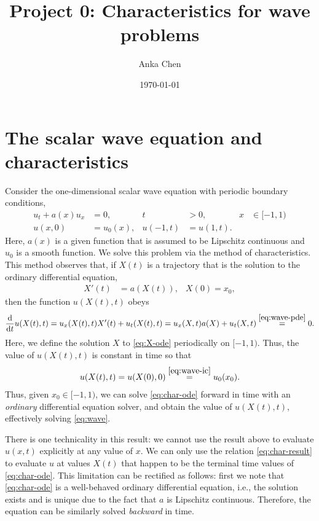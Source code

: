 \documentclass[11pt]{amsart}
\title{Project 0: Characteristics for wave problems}
\author{Anka Chen}
\date{\today}
\begin{document}
\maketitle

\section{The scalar wave equation and characteristics}
Consider the one-dimensional scalar wave equation with periodic boundary conditions,
\begin{subequations}\label{eq:wave}
  \begin{align}\label{eq:wave-pde}
    u_t + a(x) u_x &= 0, & t &> 0, & x &\in [-1,1) \\\label{eq:wave-ic}
  u(x,0) &= u_0(x), & u(-1,t) &= u(1,t).
\end{align}
\end{subequations}
Here, $a(x)$ is a given function that is assumed to be Lipschitz continuous and $u_0$ is a smooth function. We solve this problem via the method of characteristics. This method observes that, if $X(t)$ is a trajectory that is the solution to the ordinary differential equation,
\begin{align}\label{eq:X-ode}
  X'(t) &= a(X(t)), & X(0) = x_0,
\end{align}
then the function $u(X(t), t)$ obeys
\begin{align}\label{eq:char-ode}
  \frac{\mathrm{d}}{\mathrm{d} t} u(X(t),t) = u_x(X(t),t) X'(t) + u_t(X(t),t) = u_x(X,t) a(X) + u_t(X,t) \stackrel{\eqref{eq:wave-pde}}{=} 0.
\end{align}
Here, we define the solution $X$ to \eqref{eq:X-ode} periodically on $[-1,1)$. Thus, the value of $u(X(t),t)$ is constant in time so that
\begin{align}\label{eq:char-result}
  u(X(t),t) = u(X(0),0) \stackrel{\eqref{eq:wave-ic}}{=} u_0(x_0).
\end{align}
Thus, given $x_0 \in [-1,1)$, we can solve \eqref{eq:char-ode} forward in time with an \textit{ordinary} differential equation solver, and obtain the value of $u(X(t),t)$, effectively solving \eqref{eq:wave}. 

  There is one technicality in this result: we cannot use the result above to evaluate $u(x,t)$ explicitly at any value of $x$. We can only use the relation \eqref{eq:char-result} to evaluate $u$ at values $X(t)$ that happen to be the terminal time values of \eqref{eq:char-ode}. This limitation can be rectified as follows: first we note that \eqref{eq:char-ode} is a well-behaved ordinary differential equation, i.e., the solution exists and is unique due to the fact that $a$ is Lipschitz continuous. Therefore, the equation can be similarly solved \textit{backward} in time. 
\end{document}
